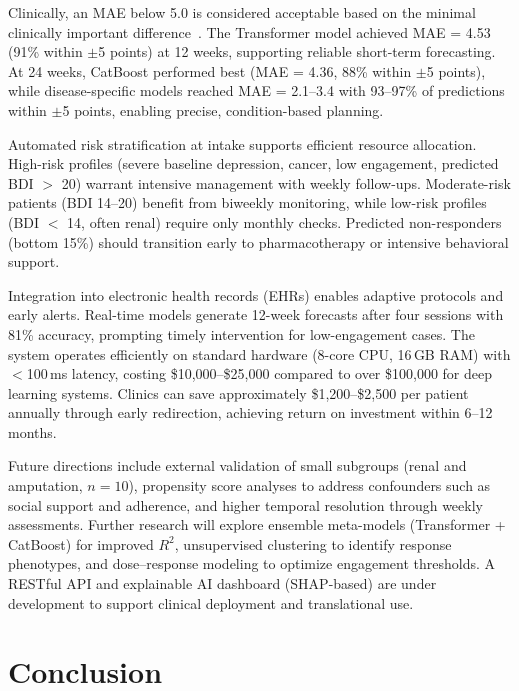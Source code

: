 \documentclass[conference]{IEEEtran}
\begin{document}
Clinically, an MAE below 5.0 is considered acceptable based on the minimal clinically important difference~\cite{beck1996manual}. The Transformer model achieved MAE = 4.53 (91\% within $\pm$5 points) at 12 weeks, supporting reliable short-term forecasting. At 24 weeks, CatBoost performed best (MAE = 4.36, 88\% within $\pm$5 points), while disease-specific models reached MAE = 2.1--3.4 with 93--97\% of predictions within $\pm$5 points, enabling precise, condition-based planning.

Automated risk stratification at intake supports efficient resource allocation. High-risk profiles (severe baseline depression, cancer, low engagement, predicted BDI $>$ 20) warrant intensive management with weekly follow-ups. Moderate-risk patients (BDI 14--20) benefit from biweekly monitoring, while low-risk profiles (BDI $<$ 14, often renal) require only monthly checks. Predicted non-responders (bottom 15\%) should transition early to pharmacotherapy or intensive behavioral support.

Integration into electronic health records (EHRs) enables adaptive protocols and early alerts. Real-time models generate 12-week forecasts after four sessions with 81\% accuracy, prompting timely intervention for low-engagement cases. The system operates efficiently on standard hardware (8-core CPU, 16\,GB RAM) with $<$100\,ms latency, costing \$10,000--\$25,000 compared to over \$100,000 for deep learning systems. Clinics can save approximately \$1,200--\$2,500 per patient annually through early redirection, achieving return on investment within 6--12 months.

Future directions include external validation of small subgroups (renal and amputation, $n=10$), propensity score analyses to address confounders such as social support and adherence, and higher temporal resolution through weekly assessments. Further research will explore ensemble meta-models (Transformer + CatBoost) for improved $R^2$, unsupervised clustering to identify response phenotypes, and dose--response modeling to optimize engagement thresholds. A RESTful API and explainable AI dashboard (SHAP-based) are under development to support clinical deployment and translational use.

\section{Conclusion}
\end{document}
